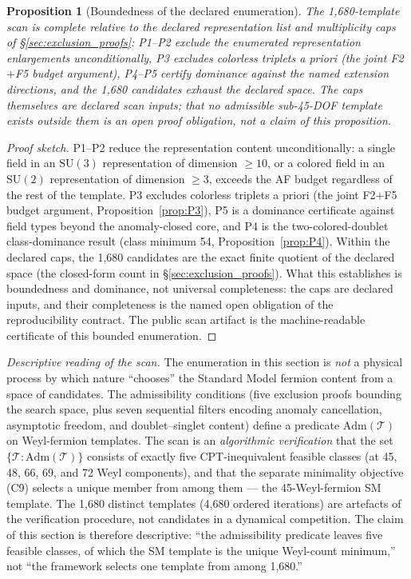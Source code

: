 \documentclass[11pt]{article}
\newtheorem{proposition}[theorem]{Proposition}
\theoremstyle{definition}
\newcommand{\SU}{\mathrm{SU}}
\begin{document}
\begin{proposition}[Boundedness of the declared enumeration]
\label{prop:scan_completeness_v35}
The 1{,}680-template scan is complete relative to the declared
representation list and multiplicity caps of
\S\ref{sec:exclusion_proofs}: P1--P2 exclude the enumerated
representation enlargements unconditionally, P3 excludes colorless
triplets a priori (the joint F2$+$F5 budget argument), P4--P5 certify
dominance against the named extension directions, and the 1{,}680
candidates exhaust the declared space.  The caps themselves are declared scan
inputs; that no admissible sub-45-DOF template exists outside them is
an open proof obligation, not a claim of this proposition.
\end{proposition}

\begin{proof}[Proof sketch]
P1--P2 reduce the representation content unconditionally: a single
field in an $\SU(3)$ representation of dimension $\ge 10$, or a
colored field in an $\SU(2)$ representation of dimension $\ge 3$,
exceeds the AF budget regardless of the rest of the template.  P3 excludes
colorless triplets a priori (the joint F2$+$F5 budget argument,
Proposition~\ref{prop:P3}), P5 is a dominance certificate against
field types beyond the anomaly-closed core, and P4 is the
two-colored-doublet class-dominance result (class minimum 54,
Proposition~\ref{prop:P4}).  Within the declared
caps, the 1{,}680 candidates are the exact finite quotient of the
declared space (the closed-form count in
\S\ref{sec:exclusion_proofs}).  What this establishes is boundedness
and dominance, not universal completeness: the caps are declared
inputs, and their completeness is the named open obligation of the
reproducibility contract.  The public scan artifact is the
machine-readable certificate of this bounded enumeration.
\end{proof}

\smallskip\noindent\textit{Descriptive reading of the scan.}\quad
The enumeration in this section is \emph{not} a physical process by
which nature ``chooses'' the Standard Model fermion content from a
space of candidates.  The admissibility conditions (five exclusion
proofs bounding the search space, plus seven sequential filters
encoding anomaly cancellation, asymptotic freedom, and
doublet--singlet content)
define a predicate
$\mathrm{Adm}(\mathcal{T})$ on Weyl-fermion templates.  The scan
is an \emph{algorithmic verification} that the set
$\{\mathcal{T} : \mathrm{Adm}(\mathcal{T})\}$ consists of exactly
five CPT-inequivalent feasible classes (at 45, 48, 66, 69, and 72
Weyl components), and that the separate minimality objective (C9)
selects a unique member from among them --- the 45-Weyl-fermion SM
template.  The 1{,}680 distinct templates (4{,}680 ordered
iterations) are artefacts of the verification procedure, not
candidates in a dynamical competition.  The claim of this section is
therefore descriptive: ``the admissibility predicate leaves five
feasible classes, of which the SM template is the unique
Weyl-count minimum,'' not ``the framework selects one template
from among 1{,}680.''
\end{document}
